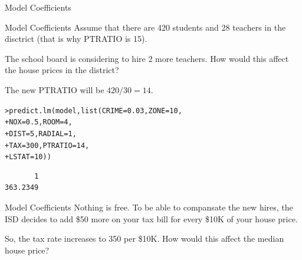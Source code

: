 \documentclass{beamer}\usepackage[]{graphicx}\usepackage[]{color}
\makeatletter
\newcommand{\hlnum}[1]{\textcolor[rgb]{0.824,0.412,0.118}{#1}}%
\newcommand{\hlstd}[1]{\textcolor[rgb]{1,0.894,0.769}{#1}}%
\newcommand{\hlkwc}[1]{\textcolor[rgb]{0.78,0.941,0.545}{#1}}%
\newcommand{\hlkwd}[1]{\textcolor[rgb]{1,0.78,0.769}{#1}}%
\newenvironment{kframe}{%
 \def\at@end@of@kframe{}%
 \ifinner\ifhmode%
  \def\at@end@of@kframe{\end{minipage}}%
  \begin{minipage}{\columnwidth}%
 \fi\fi%
 \def\FrameCommand##1{\hskip\@totalleftmargin \hskip-\fboxsep
 \colorbox{shadecolor}{##1}\hskip-\fboxsep
     \hskip-\linewidth \hskip-\@totalleftmargin \hskip\columnwidth}%
 \MakeFramed {\advance\hsize-\width
   \@totalleftmargin\z@ \linewidth\hsize
   \@setminipage}}%
 {\par\unskip\endMakeFramed%
 \at@end@of@kframe}
\newenvironment{knitrout}{}{} %
\makeatother
\begin{document}
\begin{darkframes}
\begin{frame}[fragile]{Model Coefficients}
    \end{frame}
    
    
    \begin{frame}[fragile]{Model Coefficients}
    \fontsize{9}{9}\selectfont
      Assume that there are 420 students and 28 teachers in the disctrict (that is why PTRATIO is 15). \pause
      
      \bigskip
      
      The school board is considering to hire 2 more teachers. How would this affect the house prices in the district? \pause
      
      \bigskip
      
      The new PTRATIO will be $420/30=14$. \pause
      
\begin{knitrout}
\begin{kframe}
\begin{alltt}
\hlstd{> }\hlkwd{predict.lm}\hlstd{(model,} \hlkwd{list}\hlstd{(}\hlkwc{CRIME}\hlstd{=}\hlnum{0.03}\hlstd{,} \hlkwc{ZONE}\hlstd{=}\hlnum{10}\hlstd{,}
\hlstd{+ }                       \hlkwc{NOX}\hlstd{=}\hlnum{0.5}\hlstd{,} \hlkwc{ROOM}\hlstd{=}\hlnum{4}\hlstd{,}
\hlstd{+ }                       \hlkwc{DIST}\hlstd{=}\hlnum{5}\hlstd{,}  \hlkwc{RADIAL}\hlstd{=}\hlnum{1}\hlstd{,}
\hlstd{+ }                       \hlkwc{TAX}\hlstd{=}\hlnum{300}\hlstd{,} \hlkwc{PTRATIO}\hlstd{=}\hlnum{14}\hlstd{,}
\hlstd{+ }                       \hlkwc{LSTAT}\hlstd{=}\hlnum{10}\hlstd{))}
\end{alltt}
\begin{verbatim}
       1 
363.2349 
\end{verbatim}
\end{kframe}
\end{knitrout}
    \end{frame}
    
    
    
    \begin{frame}[fragile]{Model Coefficients}
    \fontsize{9}{9}\selectfont
      Nothing is free. To be able to compansate the new hires, the ISD decides to add \$50 more on your tax bill for every \$10K of your house price. \pause
      
      \bigskip
      So, the tax rate increases to 350 per \$10K. How would this affect the median house price?
      
      \lc
    
    \end{frame}
    

\end{darkframes}
\end{document}
